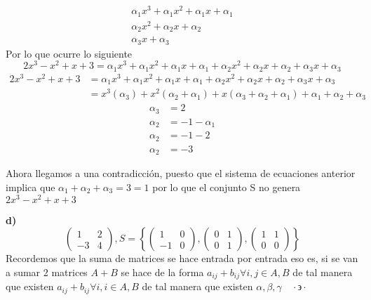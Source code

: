 \documentclass[letterpaper]{article}
\newcommand{\tq}{ \quad \cdot  \backepsilon \cdot \quad }
\renewcommand{\*}{\cdot}
\theoremstyle{definition}
\begin{document}
\begin{align*}
	\alpha_1 x^3 + \alpha_1 x^2 + \alpha_1 x + \alpha_1 	\\
	\alpha_2 x^2 + \alpha_2 x + \alpha_2 \\
	\alpha_3 x + \alpha_3 
\end{align*}
Por lo que ocurre lo siguiente
\[ 2x^3 - x^2 + x + 3 = \alpha_1 x^3 + \alpha_1 x^2 + \alpha_1 x + \alpha_1 + \alpha_2 x^2 + \alpha_2 x + \alpha_2 +\alpha_3 x + \alpha_3  \]
\begin{align*}
2x^3 - x^2 + x + 3 &= \alpha_1 x^3 + \alpha_1 x^2 + \alpha_1 x + \alpha_1 + \alpha_2 x^2 + \alpha_2 x + \alpha_2 +\alpha_3 x + \alpha_3 \\
 &= x^3 (\alpha_3)  + x^2 (\alpha_2 + \alpha_1) + x(\alpha_3 + \alpha_2 + \alpha_1) + \alpha_1 + \alpha_2 + \alpha_3
 \end{align*}
 \begin{align*}
	\alpha_3 &=  2\\
	\alpha_2 &= -1 - \alpha_1 \\
	\alpha_2 &= -1 - 2\\
	\alpha_2 &= -3
\end{align*}

Ahora llegamos a una contradicción, puesto que el sistema de ecuaciones anterior implica que $\alpha_1 + \alpha_2 + \alpha_3 = 3 = 1$ por lo que el conjunto S no genera $ 2x^3 - x^2 + x + 3$

\textbf{d)} $$ \begin{pmatrix} 1 & 2 \\ -3 & 4 \end{pmatrix},  S =  \left\lbrace \begin{pmatrix} 1 & 0 \\ -1 & 0 \end{pmatrix} , \begin{pmatrix} 0 & 1 \\ 0 &1 \end{pmatrix} , \begin{pmatrix} 1 & 1 \\ 0 &0 \end{pmatrix} \right\rbrace$$
Recordemos que la suma de matrices se hace entrada por entrada eso es, si se van a sumar 2 matrices $A + B$ se hace de la forma $a_{ij} + b_{ij}  \forall i,j \in A,B$ de tal manera que existen  $a_{ij} + b_{ij}  \forall i,i \in A,B$ de tal manera que existen $\alpha, \beta, \gamma \tq $
\end{document}
